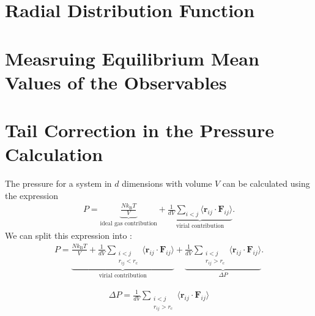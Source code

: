 \documentclass[a4paper,10pt,bibtotoc]{scrartcl}
\begin{document}
\section{Radial Distribution Function}
\section{Measruing Equilibrium Mean Values of the Observables}
\section{Tail Correction in the Pressure Calculation}
The pressure for a system in $d$ dimensions with volume $V$ can be calculated using the expression
\begin{align}
P = \underbrace{\frac{Nk_\mathrm{B}T}{V}}_{\text{ideal gas contribution}} + \underbrace{\frac{1}{dV}\sum_{i<j}\langle\mathbf{r}_{ij}\cdot\mathbf{F}_{ij}\rangle}_{\text{virial contribution}}.
\end{align}
We can split this expression into :
\begin{align}
P = \underbrace{\frac{Nk_\mathrm{B}T}{V} + \frac{1}{dV}\sum_{\substack{i<j\\ r_{ij}<r_\mathrm{c}}}\langle\mathbf{r}_{ij}\cdot\mathbf{F}_{ij}\rangle}_{\text{virial contribution}} + \underbrace{\frac{1}{dV}\sum_{\substack{i<j\\ r_{ij}>r_\mathrm{c}}}\langle\mathbf{r}_{ij}\cdot\mathbf{F}_{ij}\rangle}_{\Delta P}.
\end{align}

\begin{align}
\Delta P = \frac{1}{dV}\sum_{\substack{i<j\\ r_{ij}>r_\mathrm{c}}}\langle\mathbf{r}_{ij}\cdot\mathbf{F}_{ij}\rangle
\end{align}
\end{document}

